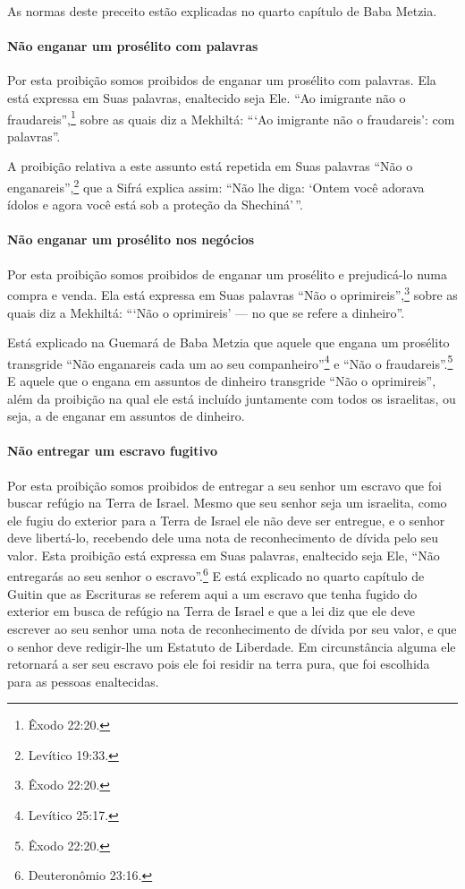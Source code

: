 As normas deste preceito estão explicadas no quarto capítulo de Baba Metzia.

\paragraph{Não enganar um prosélito com palavras}

Por esta proibição somos proibidos de enganar um prosélito com palavras.
Ela está expressa em Suas palavras, enaltecido seja Ele. ``Ao imigrante
não o fraudareis'',\footnote{Êxodo 22:20.} sobre as quais diz a Mekhiltá: ```Ao
imigrante não o fraudareis': com palavras''.

A proibição relativa a este assunto está repetida em Suas palavras ``Não
o enganareis'',\footnote{Levítico 19:33.} que a Sifrá explica assim: ``Não lhe
diga: `Ontem você adorava ídolos e agora você está sob a proteção da
Shechiná\starr'\,''.

\paragraph{Não enganar um prosélito nos negócios}

Por esta proibição somos proibidos de enganar um prosélito e
prejudicá-lo numa compra e venda. Ela está expressa em Suas palavras
``Não o oprimireis'',\footnote{Êxodo 22:20.} sobre as quais diz a Mekhiltá: ```Não o
oprimireis' --- no que se refere a dinheiro''.

Está explicado na Guemará de Baba Metzia que aquele que engana um
prosélito transgride ``Não enganareis cada um ao seu companheiro''\footnote{Levítico 25:17.} e ``Não o fraudareis''.\footnote{Êxodo 22:20.} E aquele que o
engana em assuntos de dinheiro transgride ``Não o oprimireis'', além da
proibição na qual ele está incluído juntamente com todos os israelitas,
ou seja, a de enganar em assuntos de dinheiro.

\paragraph{Não entregar um escravo fugitivo}

Por esta proibição somos proibidos de entregar a seu senhor um escravo
que foi buscar refúgio na Terra de Israel. Mesmo que seu senhor seja um
israelita, como ele fugiu do exterior para a Terra de Israel ele não
deve ser entregue, e o senhor deve libertá-lo, recebendo dele uma nota
de reconhecimento de dívida pelo seu valor. Esta proibição está
expressa em Suas palavras, enaltecido seja Ele, ``Não entregarás ao seu
senhor o escravo''.\footnote{Deuteronômio 23:16.} E está explicado no quarto
capítulo de Guitin que as Escrituras se referem aqui a um escravo que
tenha fugido do exterior em busca de refúgio na Terra de Israel e que a
lei diz que ele deve escrever ao seu senhor uma nota de reconhecimento
de dívida por seu valor, e que o senhor deve redigir-lhe um Estatuto de
Liberdade. Em circunstância alguma ele retornará a ser seu escravo pois
ele foi residir na terra pura, que foi escolhida para as pessoas
enaltecidas.

